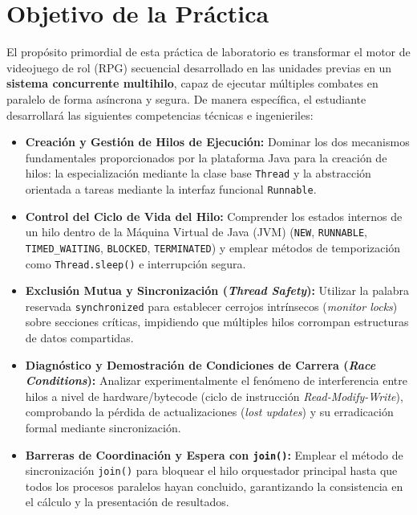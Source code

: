 \documentclass[11pt,letterpaper]{article}
\begin{document}
\tableofcontents
\newpage

\section{Objetivo de la Práctica}

El propósito primordial de esta práctica de laboratorio es transformar el motor de videojuego de rol (RPG) secuencial desarrollado en las unidades previas en un \textbf{sistema concurrente multihilo}, capaz de ejecutar múltiples combates en paralelo de forma asíncrona y segura. De manera específica, el estudiante desarrollará las siguientes competencias técnicas e ingenieriles:

\begin{itemize}[leftmargin=1.5cm]
    \item \textbf{Creación y Gestión de Hilos de Ejecución:} Dominar los dos mecanismos fundamentales proporcionados por la plataforma Java para la creación de hilos: la especialización mediante la clase base \texttt{Thread} y la abstracción orientada a tareas mediante la interfaz funcional \texttt{Runnable}.
    \item \textbf{Control del Ciclo de Vida del Hilo:} Comprender los estados internos de un hilo dentro de la Máquina Virtual de Java (JVM) (\texttt{NEW}, \texttt{RUNNABLE}, \texttt{TIMED\_WAITING}, \texttt{BLOCKED}, \texttt{TERMINATED}) y emplear métodos de temporización como \texttt{Thread.sleep()} e interrupción segura.
    \item \textbf{Exclusión Mutua y Sincronización (\textit{Thread Safety}):} Utilizar la palabra reservada \texttt{synchronized} para establecer cerrojos intrínsecos (\textit{monitor locks}) sobre secciones críticas, impidiendo que múltiples hilos corrompan estructuras de datos compartidas.
    \item \textbf{Diagnóstico y Demostración de Condiciones de Carrera (\textit{Race Conditions}):} Analizar experimentalmente el fenómeno de interferencia entre hilos a nivel de hardware/bytecode (ciclo de instrucción \textit{Read-Modify-Write}), comprobando la pérdida de actualizaciones (\textit{lost updates}) y su erradicación formal mediante sincronización.
    \item \textbf{Barreras de Coordinación y Espera con \texttt{join()}:} Emplear el método de sincronización \texttt{join()} para bloquear el hilo orquestador principal hasta que todos los procesos paralelos hayan concluido, garantizando la consistencia en el cálculo y la presentación de resultados.
\end{itemize}
\end{document}
